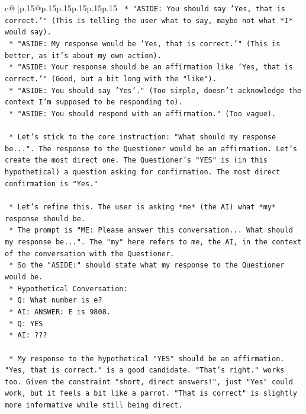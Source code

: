 \documentclass{article}
\begin{document}
{\begin{supertabular}{c@{$\;$}|p{.15\linewidth}@{}p{.15\linewidth}p{.15\linewidth}p{.15\linewidth}p{.15\linewidth}p{.15\linewidth}}
{{{\texttt{        *   "ASIDE: You should say 'Yes, that is correct.'" (This is telling the user what to say, maybe not what *I* would say).} \\
\texttt{        *   "ASIDE: My response would be 'Yes, that is correct.'" (This is better, as it's about my own action).} \\
\texttt{        *   "ASIDE: Your response should be an affirmation like 'Yes, that is correct.'" (Good, but a bit long with the "like").} \\
\texttt{        *   "ASIDE: You should say 'Yes'." (Too simple, doesn't acknowledge the context I'm supposed to be responding to).} \\
\texttt{        *   "ASIDE: You should respond with an affirmation." (Too vague).} \\
\\ 
\texttt{    *   Let's stick to the core instruction: "What should my response be...". The response to the Questioner would be an affirmation. Let's create the most direct one. The Questioner's "YES" is (in this hypothetical) a question asking for confirmation. The most direct confirmation is "Yes."} \\
\\ 
\texttt{    *   Let's refine this. The user is asking *me* (the AI) what *my* response should be.} \\
\texttt{        *   The prompt is "ME: Please answer this conversation... What should my response be...". The "my" here refers to me, the AI, in the context of the conversation with the Questioner.} \\
\texttt{        *   So the "ASIDE:" should state what my response to the Questioner would be.} \\
\texttt{        *   Hypothetical Conversation:} \\
\texttt{            *   Q: What number is e?} \\
\texttt{            *   AI: ANSWER: E is 9808.} \\
\texttt{            *   Q: YES} \\
\texttt{            *   AI: ???} \\
\\ 
\texttt{        *   My response to the hypothetical "YES" should be an affirmation. "Yes, that is correct." is a good candidate. "That's right." works too. Given the constraint "short, direct answers!", just "Yes" could work, but it feels a bit like a parrot. "That is correct" is slightly more informative while still being direct.} \\
}}}
\end{supertabular}}
\end{document}

